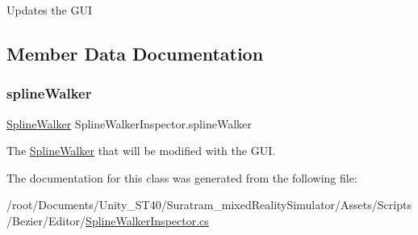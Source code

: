 Updates the G\+UI 



\subsection{Member Data Documentation}
\mbox{\label{classSplineWalkerInspector_a97a8fd319093217c295ec9c45f5f1673}} 
\subsubsection{\texorpdfstring{spline\+Walker}{splineWalker}}
{\footnotesize\ttfamily \hyperlink{classSplineWalker}{Spline\+Walker} Spline\+Walker\+Inspector.\+spline\+Walker\hspace{0.3cm}{\ttfamily [private]}}



The \hyperlink{classSplineWalker}{Spline\+Walker} that will be modified with the G\+UI.



The documentation for this class was generated from the following file\+:\begin{DoxyCompactItemize}
\item 
/root/\+Documents/\+Unity\+\_\+\+S\+T40/\+Suratram\+\_\+mixed\+Reality\+Simulator/\+Assets/\+Scripts/\+Bezier/\+Editor/\hyperlink{SplineWalkerInspector_8cs}{Spline\+Walker\+Inspector.\+cs}\end{DoxyCompactItemize}
